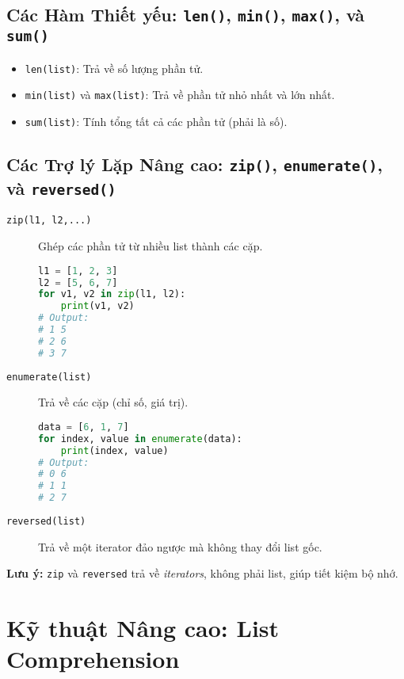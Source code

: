 \documentclass[11pt]{article}
\begin{document}
\subsection{Các Hàm Thiết yếu: \texttt{len()}, \texttt{min()}, \texttt{max()}, và \texttt{sum()}}
\begin{itemize}
    \item \texttt{len(list)}: Trả về số lượng phần tử.
    \item \texttt{min(list)} và \texttt{max(list)}: Trả về phần tử nhỏ nhất và lớn nhất.
    \item \texttt{sum(list)}: Tính tổng tất cả các phần tử (phải là số).
\end{itemize}

\subsection{Các Trợ lý Lặp Nâng cao: \texttt{zip()}, \texttt{enumerate()}, và \texttt{reversed()}}
\begin{description}
    \item[\texttt{zip(l1, l2,...)}] Ghép các phần tử từ nhiều list thành các cặp.
    \begin{lstlisting}[language=Python]
l1 = [1, 2, 3]
l2 = [5, 6, 7]
for v1, v2 in zip(l1, l2):
    print(v1, v2)
# Output:
# 1 5
# 2 6
# 3 7
    \end{lstlisting}
    \item[\texttt{enumerate(list)}] Trả về các cặp (chỉ số, giá trị).
    \begin{lstlisting}[language=Python]
data = [6, 1, 7]
for index, value in enumerate(data):
    print(index, value)
# Output:
# 0 6
# 1 1
# 2 7
    \end{lstlisting}
    \item[\texttt{reversed(list)}] Trả về một iterator đảo ngược mà không thay đổi list gốc.
\end{description}
\textbf{Lưu ý:} \texttt{zip} và \texttt{reversed} trả về \textit{iterators}, không phải list, giúp tiết kiệm bộ nhớ.

\section{Kỹ thuật Nâng cao: List Comprehension}
\end{document}
